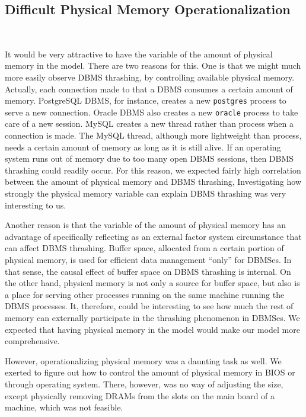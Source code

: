 \subsection{Difficult Physical Memory Operationalization}~\label{sec:buffer_space_oper}

It would be very attractive to have the variable of the amount of physical memory in the model.
There are two reasons for this. 
One is that we might much more easily observe DBMS thrashing, by controlling available physical memory.
Actually, each connection made to that a DBMS consumes a certain amount of memory. 
PostgreSQL DBMS, for instance, creates a new {\tt postgres} process to serve a new connection. 
Oracle DBMS also creates a new {\tt oracle} process to take care of a new session. 
MySQL creates a new thread rather than process when a connection is made. 
The MySQL thread, although more lightweight than process, needs a certain amount of memory as long as it is still alive. 
If an operating system runs out of memory due to too many open DBMS sessions, 
then DBMS thrashing could readily occur. 
For this reason, we expected fairly high correlation between the amount of physical memory and DBMS thrashing, 
Investigating how strongly the physical memory variable can explain DBMS thrashing was very interesting to us.

Another reason is that the variable of the amount of physical memory has an advantage 
of specifically reflecting as an external factor system circumstance that can affect DBMS thrashing. 
Buffer space, allocated from a certain portion of physical memory, is used for efficient data management ``only'' for DBMSes. 
In that sense, the causal effect of buffer space on DBMS thrashing is internal.
On the other hand, physical memory is not only a source for buffer space, but also is a place for serving other processes 
running on the same machine running the DBMS processes.
It, therefore, could be interesting to see how much the rest of memory can externally participate in the thrashing phenomenon in DBMSes. 
We expected that having physical memory in the model would make our model more comprehensive.

However, operationalizing physical memory was a daunting task as well. 
We exerted to figure out how to control the amount of physical memory in BIOS or through operating system.
There, however, was no way of adjusting the size, 
except physically removing DRAMs from the slots on the main board of a machine, which was not feasible. 

